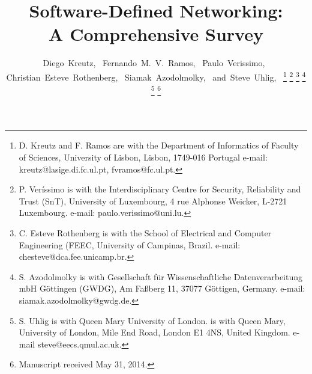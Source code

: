\documentclass[journal]{IEEEtran}
\begin{document}
%

%
\title{Software-Defined Networking: \\A Comprehensive Survey}


%
%
%

\author{Diego~Kreutz,~
        Fernando~M.~V.~Ramos,~
        Paulo~Verissimo,~
        Christian~Esteve~Rothenberg,~        
        Siamak~Azodolmolky,~        
        and~Steve~Uhlig,~%
\thanks{D. Kreutz and F. Ramos are with the Department of Informatics of Faculty of Sciences, University of Lisbon, Lisbon,
	1749-016 Portugal e-mail: kreutz@lasige.di.fc.ul.pt, fvramos@fc.ul.pt.}
\thanks{P. Ver\'{i}ssimo is with the Interdisciplinary Centre for Security, Reliability and Trust (SnT), University of Luxembourg,
	4 rue Alphonse Weicker,  L-2721 Luxembourg. e-mail: paulo.verissimo@uni.lu.}    
\thanks{C. Esteve Rothenberg is with the School of Electrical and Computer Engineering (FEEC, University of Campinas, Brazil. e-mail: chesteve@dca.fee.unicamp.br.}
\thanks{S. Azodolmolky is with Gesellschaft f\"{u}r Wissenschaftliche Datenverarbeitung mbH G\"{o}ttingen (GWDG), Am Fa{\ss}berg 11, 37077 G\"{o}ttigen, Germany. e-mail: siamak.azodolmolky@gwdg.de.}
\thanks{S. Uhlig is with Queen Mary University of London. is with Queen Mary, University of London, Mile End Road, London E1 4NS, United Kingdom. e-mail steve@eecs.qmul.ac.uk.}%
\thanks{Manuscript received May 31, 2014.}
}
\end{document}
